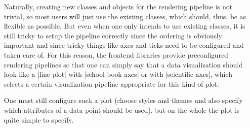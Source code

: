 Naturally, creating new classes and objects for the rendering pipeline
is not trivial, so most users will just use the existing classes,
which should, thus, be as flexible as possible. But even when one only
intends to use existing classes, it is still tricky to setup the
pipeline correctly since the ordering is obviously important and since
tricky things like axes and ticks need to be configured and taken care
of. For this reason, the frontend libraries provide
preconfigured rendering pipelines so that one can simply say that a
data visualization should look like a |line plot| with
|school book axes| or with |scientific axes|, which selects a certain
visualization pipeline appropriate for this kind of plot:
\begin{codeexample}[]
\end{codeexample}
\begin{codeexample}[]
\end{codeexample}
One must still configure such a plot (choose styles and themes
and also specify which attributes of a data point should be used), but
on the whole the plot is quite simple to specify.



